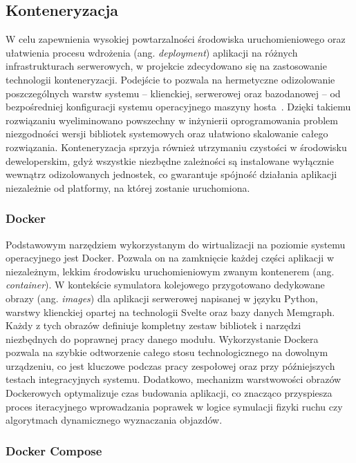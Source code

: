 \documentclass[twoside]{projektInzynierskiMS1z}
\begin{document}
\subsection{Konteneryzacja}

W celu zapewnienia wysokiej powtarzalności środowiska uruchomieniowego oraz ułatwienia
procesu wdrożenia (ang. \emph{deployment}) aplikacji na różnych infrastrukturach
serwerowych, w projekcie zdecydowano się na zastosowanie technologii konteneryzacji.
Podejście to pozwala na hermetyczne odizolowanie poszczególnych warstw systemu --
klienckiej, serwerowej oraz bazodanowej -- od bezpośredniej konfiguracji systemu
operacyjnego maszyny hosta~\cite{docker}. Dzięki takiemu rozwiązaniu wyeliminowano
powszechny w inżynierii oprogramowania problem niezgodności wersji bibliotek systemowych
oraz ułatwiono skalowanie całego rozwiązania. Konteneryzacja sprzyja również utrzymaniu
czystości w środowisku deweloperskim, gdyż wszystkie niezbędne zależności są instalowane
wyłącznie wewnątrz odizolowanych jednostek, co gwarantuje spójność działania aplikacji
niezależnie od platformy, na której zostanie uruchomiona.

\subsubsection{Docker}

Podstawowym narzędziem wykorzystanym do wirtualizacji na poziomie systemu operacyjnego
jest Docker. Pozwala on na zamknięcie każdej części aplikacji w niezależnym, lekkim
środowisku uruchomieniowym zwanym kontenerem (ang. \emph{container}). W kontekście
symulatora kolejowego przygotowano dedykowane obrazy (ang. \emph{images}) dla aplikacji
serwerowej napisanej w języku Python, warstwy klienckiej opartej na technologii Svelte
oraz bazy danych Memgraph. Każdy z tych obrazów definiuje kompletny zestaw bibliotek
i narzędzi niezbędnych do poprawnej pracy danego modułu. Wykorzystanie Dockera pozwala
na szybkie odtworzenie całego stosu technologicznego na dowolnym urządzeniu, co jest
kluczowe podczas pracy zespołowej oraz przy późniejszych testach integracyjnych systemu.
Dodatkowo, mechanizm warstwowości obrazów Dockerowych optymalizuje czas budowania
aplikacji, co znacząco przyspiesza proces iteracyjnego wprowadzania poprawek w logice
symulacji fizyki ruchu czy algorytmach dynamicznego wyznaczania objazdów.

\subsubsection{Docker Compose}
\end{document}
